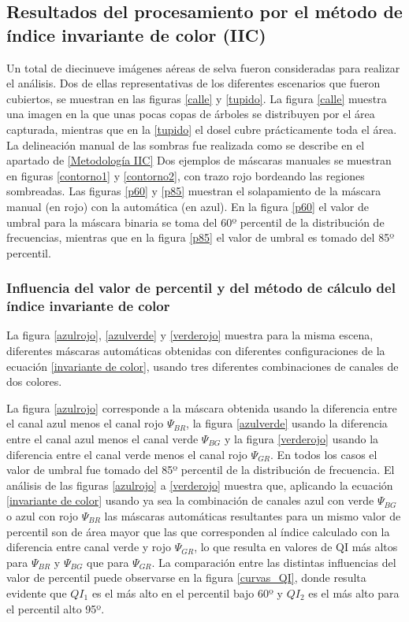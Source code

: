 \subsection{Resultados del procesamiento por el método de índice invariante de color (IIC)} \label{Resultados IIC}
Un total de diecinueve imágenes aéreas de selva fueron consideradas para realizar el análisis. Dos de ellas representativas de los diferentes escenarios que fueron cubiertos, se muestran en las figuras \ref{calle} y \ref{tupido}. La figura \ref{calle} muestra una imagen en la que unas pocas copas de árboles se distribuyen por el área capturada, mientras que en la \ref{tupido} el dosel cubre prácticamente toda el área. La delineación manual de las sombras fue realizada como se describe en el apartado de \ref{Metodología IIC}
Dos ejemplos de máscaras manuales se muestran en figuras \ref{contorno1} y \ref{contorno2}, con trazo rojo bordeando las regiones sombreadas. Las figuras \ref{p60} y \ref{p85} muestran el solapamiento de la máscara manual (en rojo) con la automática (en azul). En la figura \ref{p60} el valor de umbral para la máscara binaria se toma del 60º percentil de la distribución de frecuencias, mientras que en la figura \ref{p85} el valor de umbral es tomado del 85º percentil.

\subsubsection{Influencia del valor de percentil y del método de cálculo del índice invariante de color}

La figura \ref{azulrojo}, \ref{azulverde} y \ref{verderojo} muestra para la misma escena, diferentes máscaras automáticas obtenidas con diferentes configuraciones de la ecuación \ref{invariante de color}, usando tres diferentes combinaciones de canales de dos colores.



La figura \ref{azulrojo} corresponde a la máscara obtenida usando la diferencia entre el canal azul menos el canal rojo $\Psi_{BR}$, la figura \ref{azulverde} usando la diferencia entre el canal azul menos el canal verde $\Psi_{BG}$ y la figura \ref{verderojo} usando la diferencia entre el canal verde menos el canal rojo $\Psi_{GR}$. En todos los casos el valor de umbral fue tomado del 85º percentil de la distribución de frecuencia. El análisis de las figuras \ref{azulrojo} a \ref{verderojo} muestra que, aplicando la ecuación \ref{invariante de color} usando ya sea la combinación de canales azul con verde $\Psi_{BG}$ o azul con rojo $\Psi_{BR}$  las máscaras automáticas resultantes para un mismo valor de percentil son de área mayor que las que corresponden al índice calculado con la diferencia entre canal verde y rojo $\Psi_{GR}$, lo que resulta en valores de QI más altos para $\Psi_{BR}$ y $\Psi_{BG}$ que para $\Psi_{GR}$. La comparación entre las distintas influencias del valor de percentil puede observarse en la figura \ref{curvas_QI}, donde resulta evidente que $QI_1$ es el más alto en el percentil bajo 60º y $QI_2$ es el más alto para el percentil alto 95º. 

